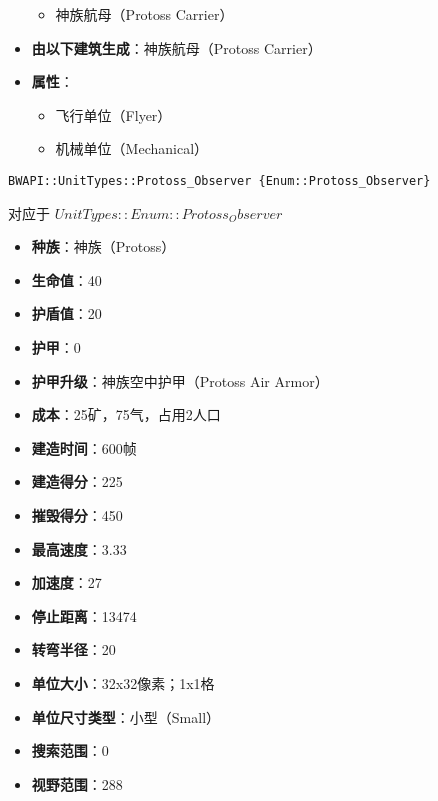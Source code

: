 \begin{tcolorbox}[colback=white, colframe=black!60!white, title=Protoss\_Interceptor(), arc=0mm]
\begin{itemize}
            \begin{itemize}
                \item 神族航母（Protoss Carrier）
            \end{itemize}
        \item \textbf{由以下建筑生成}：神族航母（Protoss Carrier）
        \item \textbf{属性}：
            \begin{itemize}
                \item 飞行单位（Flyer）
                \item 机械单位（Mechanical）
            \end{itemize}
    \end{itemize}
\end{tcolorbox}

\begin{tcolorbox}[colback=white, colframe=black!60!white, title=Protoss\_Observer(), arc=0mm]
    \begin{verbatim}
BWAPI::UnitTypes::Protoss_Observer {Enum::Protoss_Observer}
    \end{verbatim}
    对应于  $ UnitTypes::Enum::Protoss_Observer $ 
    \begin{itemize}
        \item \textbf{种族}：神族（Protoss）
        \item \textbf{生命值}：40
        \item \textbf{护盾值}：20
        \item \textbf{护甲}：0
        \item \textbf{护甲升级}：神族空中护甲（Protoss Air Armor）
        \item \textbf{成本}：25矿，75气，占用2人口
        \item \textbf{建造时间}：600帧
        \item \textbf{建造得分}：225
        \item \textbf{摧毁得分}：450
        \item \textbf{最高速度}：3.33
        \item \textbf{加速度}：27
        \item \textbf{停止距离}：13474
        \item \textbf{转弯半径}：20
        \item \textbf{单位大小}：32x32像素；1x1格
        \item \textbf{单位尺寸类型}：小型（Small）
        \item \textbf{搜索范围}：0
        \item \textbf{视野范围}：288

\end{itemize}
\end{tcolorbox}
